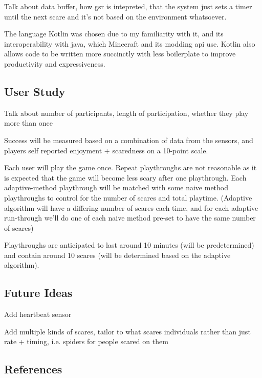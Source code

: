 \documentclass[12pt,a4paper]{article}
\begin{document}
Talk about data buffer, how gsr is intepreted, that the system just sets a timer until the next scare and it's not based on the environment whatsoever.

The language Kotlin was chosen due to my familiarity with it, and its interoperability with java, which Minecraft and its modding api use. Kotlin also allows code to be written more succinctly with less boilerplate to improve productivity and expressiveness.

\subsection{User Study}
Talk about number of participants, length of participation, whether they play more than once

Success will be measured based on a combination of data from the sensors, and players self reported enjoyment + scaredness on a 10-point scale.

Each user will play the game once. Repeat playthroughs are not reasonable as it is expected that the game will become less scary after one playthrough. Each adaptive-method playthrough will be matched with some naive method playthroughs to control for the number of scares and total playtime. (Adaptive algorithm will have a differing number of scares each time, and for each adaptive run-through we'll do one of each naive method pre-set to have the same number of scares)

Playthroughs are anticipated to last around 10 minutes (will be predetermined) and contain around 10 scares (will be determined based on the adaptive algorithm).

\subsection{Future Ideas}
Add heartbeat sensor

Add multiple kinds of scares, tailor to what scares individuals rather than just rate + timing, i.e. spiders for people scared on them

\subsection{References}

\end{document}
